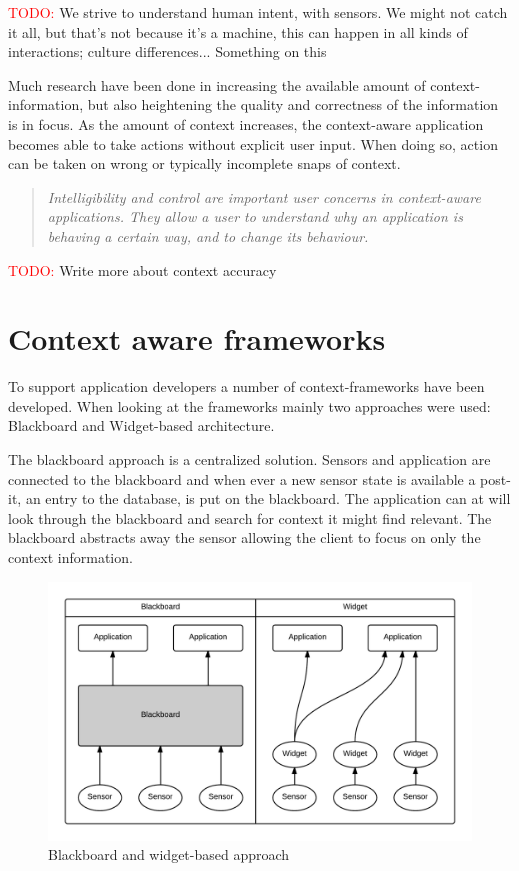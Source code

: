 \documentclass[]{report}
\newcommand\todo[1]{\textcolor{red}{TODO: }#1\PackageWarning{TODO:}{TODO tag!!}}
\begin{document}
\todo{We strive to understand human intent, with sensors. We might not catch it all, but that's not because it's a machine, this can happen in all kinds of interactions; culture differences... Something on this}


Much research have been done in increasing the available amount of context-information, but also heightening the quality and correctness of the information is in focus. As the amount of context increases, the context-aware application becomes able to take actions without explicit user input. When doing so, action can be taken on wrong or typically incomplete snaps of context. 


\blockquote{\textit{Intelligibility and control are important user concerns in context-aware applications. They allow a user to understand why an application is behaving a certain way, and to change its behaviour.}} \cite{Dey and Newberger (2009)}

\todo Write more about context accuracy


\section{Context aware frameworks}
To support application developers a number of context-frameworks have been developed. When looking at the frameworks mainly two approaches were used: Blackboard and Widget-based architecture.

The blackboard approach is a centralized solution. Sensors and application are connected to the blackboard and when ever a new sensor state is available a post-it, an entry to the database, is put on the blackboard. The application can at will look through the blackboard and search for context it might find relevant. The blackboard abstracts away the sensor allowing the client to focus on only the context information. 

\begin{figure}
\centering
\includegraphics[width=\linewidth]{blackboard-widget.png}
\caption{Blackboard and widget-based approach}
\label{fig:blackboard-widget}
\end{figure}
\end{document}
